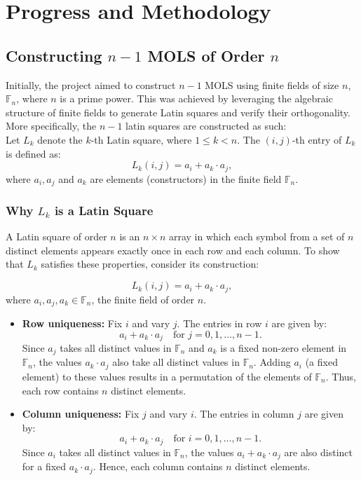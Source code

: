 \documentclass[12pt]{article}
\begin{document}
\section{Progress and Methodology}
\subsection{Constructing \(n-1\) MOLS of Order \(n\)}
Initially, the project aimed to construct \(n-1\) MOLS using finite fields of size \(n\), $\mathbb F_n$, where \(n\) is a prime power. This was achieved by leveraging the algebraic structure of finite fields to generate Latin squares and verify their orthogonality. More specifically, the \(n-1\) latin squares are constructed as such: \\
Let \( L_k \) denote the \( k \)-th Latin square, where \( 1 \leq k < n \). The \((i, j)\)-th entry of \( L_k \) is defined as:
\[
L_k(i, j) = a_i + a_k \cdot a_j,
\]
where \( a_i, a_j \) and \(a_k\) are elements (constructors) in the finite field \( \mathbb{F}_n \). \\

\subsubsection{Why \( L_k \) is a Latin Square} 

A Latin square of order \( n \) is an \( n \times n \) array in which each symbol from a set of \( n \) distinct elements appears exactly once in each row and each column. To show that \( L_k \) satisfies these properties, consider its construction:

\[
L_k(i, j) = a_i + a_k \cdot a_j,
\]
where \( a_i, a_j, a_k \in \mathbb{F}_n \), the finite field of order \( n \).

\begin{itemize}
    \item \textbf{Row uniqueness:} Fix \( i \) and vary \( j \). The entries in row \( i \) are given by:
    \[
    a_i + a_k \cdot a_j \quad \text{for } j = 0, 1, \dots, n-1.
    \]
    Since \( a_j \) takes all distinct values in \( \mathbb{F}_n \) and \( a_k \) is a fixed non-zero element in \( \mathbb{F}_n \), the values \( a_k \cdot a_j \) also take all distinct values in \( \mathbb{F}_n \). Adding \( a_i \) (a fixed element) to these values results in a permutation of the elements of \( \mathbb{F}_n \). Thus, each row contains \( n \) distinct elements.

    \item \textbf{Column uniqueness:} Fix \( j \) and vary \( i \). The entries in column \( j \) are given by:
    \[
    a_i + a_k \cdot a_j \quad \text{for } i = 0, 1, \dots, n-1.
    \]
    Since \( a_i \) takes all distinct values in \( \mathbb{F}_n \), the values \( a_i + a_k \cdot a_j \) are also distinct for a fixed \( a_k \cdot a_j \). Hence, each column contains \( n \) distinct elements.
\end{itemize}
\end{document}
